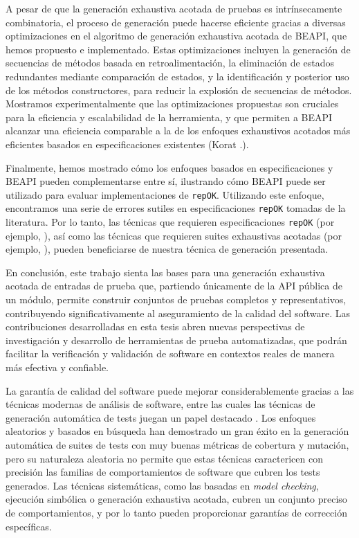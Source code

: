 A pesar de que la generación exhaustiva acotada de pruebas es intrínsecamente combinatoria, 
el proceso de generación puede hacerse eficiente gracias a diversas optimizaciones en el algoritmo de generación exhaustiva acotada de BEAPI, que hemos propuesto e implementado. 
Estas optimizaciones incluyen la generación de secuencias de métodos basada en retroalimentación, la eliminación de estados redundantes mediante comparación de estados, y la identificación y posterior uso de los métodos constructores, para reducir la explosión de secuencias de métodos. 
Mostramos experimentalmente que las optimizaciones propuestas son cruciales para la eficiencia y escalabilidad de la herramienta, y que permiten a BEAPI alcanzar una eficiencia comparable a la de los enfoques exhaustivos acotados más eficientes basados en especificaciones existentes (Korat \cite{Boyapati02}.).

Finalmente, hemos mostrado cómo los enfoques basados en especificaciones y BEAPI pueden complementarse entre sí, 
ilustrando cómo BEAPI puede ser utilizado para evaluar implementaciones de \texttt{repOK}. Utilizando este enfoque, 
encontramos una serie de errores sutiles en especificaciones \texttt{repOK} tomadas de la literatura. Por lo tanto, 
las técnicas que requieren especificaciones \texttt{repOK} (por ejemplo, \cite{Rosner15}), así como las técnicas que requieren 
suites exhaustivas acotadas (por ejemplo, \cite{Molina+2021}), pueden beneficiarse de nuestra técnica de generación presentada.

En conclusión, este trabajo sienta las bases para una generación exhaustiva acotada de entradas de prueba que, partiendo únicamente de la API pública de un módulo, 
permite construir conjuntos de pruebas completos y representativos, contribuyendo significativamente al aseguramiento de la calidad del software. 
Las contribuciones desarrolladas en esta tesis abren nuevas perspectivas de investigación y desarrollo de herramientas de prueba automatizadas, 
que podrán facilitar la verificación y validación de software en contextos reales de manera más efectiva y confiable.


La garantía de calidad del software puede mejorar considerablemente gracias a las técnicas modernas de análisis de software, 
entre las cuales las técnicas de generación automática de tests juegan un papel destacado \cite{Cadar08, Luckow14, Fraser11, Pacheco07, Ma15, goGodefroid05, Marinov01, Boyapati02,Godefroid12}. 
Los enfoques aleatorios y basados en búsqueda han demostrado un gran éxito en la generación automática de suites de tests con muy buenas métricas de cobertura y mutación, 
pero su naturaleza aleatoria no permite que estas técnicas caractericen con precisión las familias de comportamientos de software 
que cubren los tests generados. Las técnicas sistemáticas, como las basadas en \emph{model checking}, ejecución simbólica 
o generación exhaustiva acotada, cubren un conjunto preciso de comportamientos, y por lo tanto pueden proporcionar garantías 
de corrección específicas.

